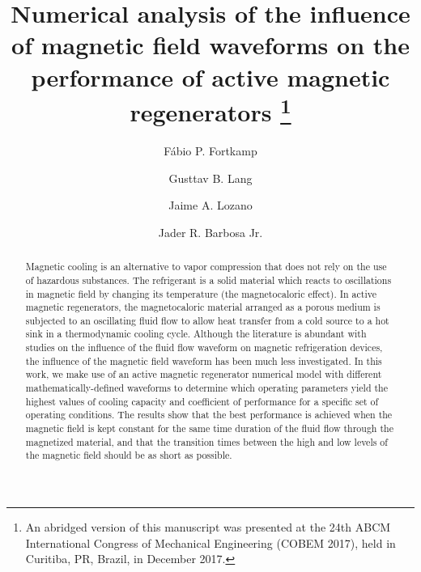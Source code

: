 \documentclass[referee]{svjour3}
\begin{document}
\title{Numerical analysis of the influence of magnetic field waveforms on the performance of active magnetic regenerators
\thanks{
An abridged version of this manuscript was presented at the 24th ABCM International Congress of Mechanical Engineering (COBEM 2017), held in Curitiba, PR, Brazil, in December 2017.
}}

\author{
F\'{a}bio P. Fortkamp \and
Gusttav B. Lang \and
Jaime A. Lozano \and
Jader R. Barbosa Jr.
}




\date{}

\maketitle

\begin{abstract}
Magnetic cooling is an alternative to vapor compression that does not rely on the use of hazardous substances. The refrigerant is a solid material which reacts to oscillations in magnetic field by changing its temperature (the magnetocaloric effect). In active magnetic regenerators, the magnetocaloric material arranged as a porous medium is subjected to an oscillating fluid flow to allow heat transfer from a cold source to a hot sink in a thermodynamic cooling cycle. Although the  literature is abundant with studies on the influence of the fluid flow waveform on magnetic refrigeration devices, the influence of the magnetic field waveform has been much less investigated. In this work, we make use of an active magnetic regenerator numerical model with different mathematically-defined waveforms to determine which operating parameters yield the highest values of cooling capacity and coefficient of performance for a specific set of operating conditions. The results show that the best performance is achieved when the magnetic field is kept constant for the same time duration of the fluid flow through the magnetized material, and that the transition times between the high and low levels of the magnetic field should be as short as possible.

\end{abstract}
\end{document}
